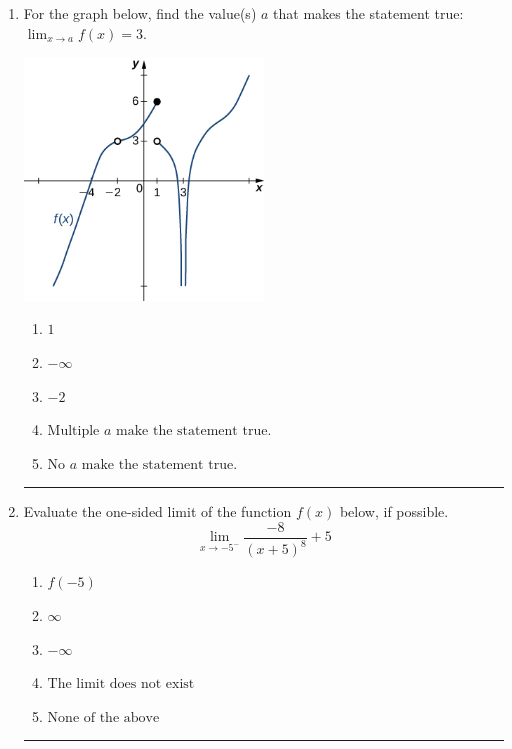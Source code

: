 \documentclass[14pt]{extbook}
\newcommand{\litem}[1]{\item#1\hspace*{-1cm}\rule{\textwidth}{0.4pt}}
\begin{document}
\begin{enumerate}
\litem{
For the graph below, find the value(s) $a$ that makes the statement true: $ \displaystyle \lim_{x \rightarrow a} f(x) = 3$.
\begin{center}
    \includegraphics[width=0.5\textwidth]{../Figures/evaluateLimitGraphicallyA.png}
\end{center}
\begin{enumerate}[label=\Alph*.]
\item \( 1 \)
\item \( -\infty \)
\item \( -2 \)
\item \( \text{Multiple } a \text{ make the statement true}. \)
\item \( \text{No } a \text{ make the statement true}. \)

\end{enumerate} }
\litem{
Evaluate the one-sided limit of the function $f(x)$ below, if possible.\[ \lim_{x \rightarrow -5^-} \frac{-8}{(x+5)^8}+5 \]\begin{enumerate}[label=\Alph*.]
\item \( f(-5) \)
\item \( \infty \)
\item \( -\infty \)
\item \( \text{The limit does not exist} \)
\item \( \text{None of the above} \)


\end{enumerate}}
\end{enumerate}
\end{document}
